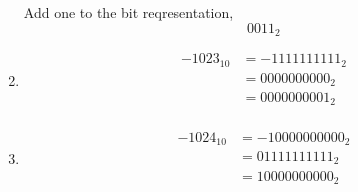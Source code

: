 \documentclass{article}
\begin{document}
\begin{enumerate}[label=(\alph*)]
    Add one to the bit reqresentation,\\
    \begin{equation*}
    0011_{2}
    \end{equation*}
\item
    \begin{align*}
    -1023_{10} &= -11 1111 1111_{2}\\
               &= 00 0000 0000_{2} \\
               &= 00 0000 0001_{2} \\
    \end{align*}
\item
    \begin{align*}
    -1024_{10} &= -100 0000 0000_{2}\\
               &= 011 1111 1111_{2} \\
               &= 100 0000 0000_{2} \\
    \end{align*}
\end{enumerate}
\end{document}
